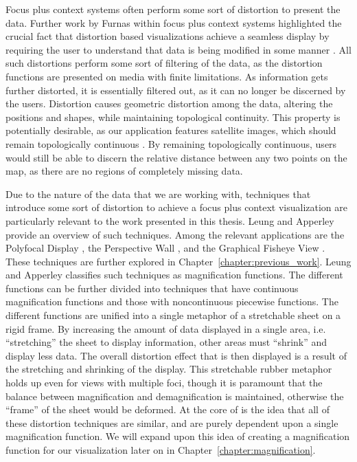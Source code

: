 Focus plus context systems often perform some sort of distortion to present the data. Further work by Furnas within focus plus context systems highlighted the crucial fact that distortion based visualizations achieve a seamless display by requiring the user to understand that data is being modified in some manner \cite{Furnas2006}. All such distortions perform some sort of filtering of the data, as the distortion functions are presented on media with finite limitations. As information
gets further distorted, it is essentially filtered out, as it can no longer be discerned by the users. Distortion causes geometric distortion among the data, altering the positions and shapes, while maintaining topological continuity. This property is potentially desirable, as our application features satellite images, which should remain topologically continuous \cite{Furnas2006}. By remaining topologically continuous, users would still be able to discern the
relative distance between any two points on the map, as there are no regions of completely missing data.

Due to the nature of the data that we are working with, techniques that introduce some sort of distortion to achieve a focus plus context visualization are particularly relevant to the work presented in this thesis. Leung and Apperley provide an overview of such techniques\cite{Leung1994}. Among the relevant applications are the Polyfocal Display \cite{Kadmon1978}, the Perspective Wall \cite{Mackinlay1991}, and the Graphical Fisheye View \cite{Sarkar1992}. These techniques are further explored in
Chapter~\ref{chapter:previous_work}. Leung and Apperley classifies such techniques as magnification functions. The different functions can be further divided into techniques that have continuous magnification functions and those with noncontinuous piecewise functions. The different functions are unified into a single metaphor of a stretchable sheet on a rigid frame. By increasing the amount of data displayed in a single area, i.e. ``stretching'' the sheet to display information, other areas must ``shrink'' and display less data. The overall distortion effect that is then displayed is a result of the stretching and shrinking of the display.
This stretchable rubber metaphor holds up even for views with multiple foci, though it is paramount that the balance between magnification and demagnification is maintained, otherwise the ``frame'' of the sheet would be deformed. At the core of \cite{Leung1994} is the idea that all of these distortion techniques are similar, and are purely dependent upon a single magnification function. We will expand upon this idea of creating a magnification function for our visualization later on in Chapter~\ref{chapter:magnification}.

